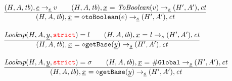 \documentclass[a4paper, leqno]{amsart}
\newcommand{\rulesep}{\quad\quad}
\newcommand{\stmt}{s}
\newcommand{\expr}{e}
\newcommand{\ir}[1]{\ensuremath{\underline{#1}}}
\newcommand{\irid}{\ir{x}}
\def\inred{\color{red}}
\newcommand{\strict}{{\inred\tt strict}}
\newcommand{\er}{\ensuremath{\sigma}}
\newcommand{\tb}{\emph{tb}}
\renewcommand{\lg}{{\tt \#Global}}
\newcommand{\ct}{\emph{ct}}
\newcommand{\hf}[1]{\emph{#1}}
\newcommand{\state}{\ensuremath{(H,A,\tb)}}
\newcommand{\resp}{\ensuremath{(H',A')}}
\newcommand{\evale}{\ensuremath{(H,A,\tb)}}
\def\inred{\color{red}}
\begin{document}
\[\begin{array}{l@{~~}l@{~~}ll}
\frac{\begin{matrix}
\evale, \ir{\expr} \rightarrow_{\ir\expr} v
\rulesep
\state, \irid \ {\tt =} \ \hf{ToBoolean}(v) \rightarrow_{\ir\stmt} \resp, \ct
\end{matrix}}{\begin{matrix}
\state, \irid \ {\tt = {\diamond}toBoolean}(e)  \rightarrow_{\ir\stmt} \resp, \ct
\end{matrix}}
\\[2em]

\frac{\begin{matrix}
\hf{Lookup}(H,A,\ir{y},\strict) = l
\rulesep
\state, \irid \ {\tt =} \ l \rightarrow_{\ir\stmt} \resp, \ct
\end{matrix}}{\begin{matrix}
\state, \irid \ {\tt = {\diamond}getBase}(\ir{y})  \rightarrow_{\ir\stmt} \resp, \ct
\end{matrix}}
\\[2em]

\frac{\begin{matrix}
\hf{Lookup}(H,A,\ir{y},\strict) = \er
\rulesep
\state, \irid \ {\tt =} \ \lg \rightarrow_{\ir\stmt} \resp, \ct
\end{matrix}}{\begin{matrix}
\state, \irid \ {\tt = {\diamond}getBase}(\ir{y})  \rightarrow_{\ir\stmt} \resp, \ct
\end{matrix}}
\\[2em]

\end{array}
\]
\end{document}

